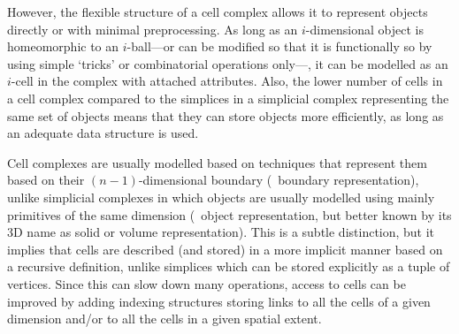 However, the flexible structure of a cell complex allows it to represent objects directly or with minimal preprocessing.
As long as an $i$-dimensional object is homeomorphic to an $i$-ball---or can be modified so that it is functionally so by using simple `tricks' or combinatorial operations only---, it can be modelled as an $i$-cell in the complex with attached attributes.
Also, the lower number of cells in a cell complex compared to the simplices in a simplicial complex representing the same set of objects means that they can store objects more efficiently, as long as an adequate data structure is used.

Cell complexes are usually modelled based on techniques that represent them based on their $(n-1)$-dimensional boundary (\ie\ boundary representation), unlike simplicial complexes in which objects are usually modelled using mainly primitives of the same dimension (\ie\ object representation, but better known by its 3D name as solid or volume representation).
This is a subtle distinction, but it implies that cells are described (and stored) in a more implicit manner based on a recursive definition, unlike simplices which can be stored explicitly as a tuple of vertices.
Since this can slow down many operations, access to cells can be improved by adding indexing structures storing links to all the cells of a given dimension and/or to all the cells in a given spatial extent.

